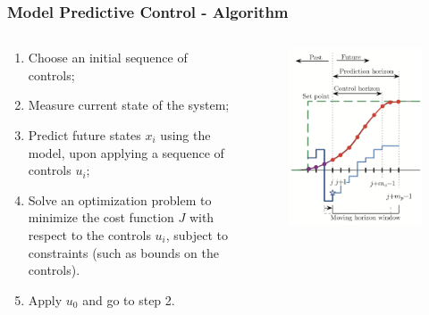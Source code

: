 \documentclass{beamer}
\begin{document}
		\begin{frame}
				\frametitle{Model Predictive Control - Algorithm}
				
			\begin{columns} 
				\begin{column}{.52\textwidth}
					\begin{enumerate}
						\item Choose an initial sequence of controls;
						\item Measure current state of the system;
						\item Predict future states $x_i$ using the model, upon applying a sequence of controls $u_i$;
						\item Solve an optimization problem to minimize the cost function $J$ with respect to the controls $u_i$, subject to constraints (such as bounds on the controls).
						\item Apply $u_0$ and go to step 2.
					\end{enumerate}
				\end{column}
				\begin{column}{.52\textwidth}
					\begin{figure}
						\centering
						\includegraphics[scale=0.35]{images/mpc_intro}
						\label{fig:mpcintro}
					\end{figure}
				\end{column}
				

\end{columns}
\end{frame}
\end{document}
